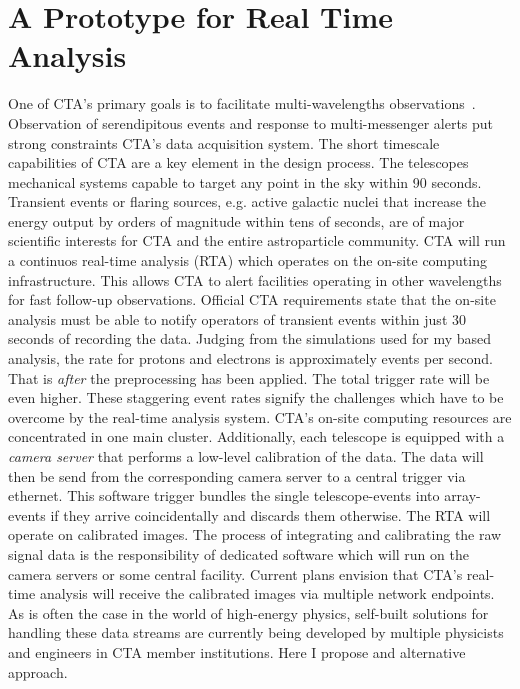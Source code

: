 \chapter{A Prototype for  Real Time Analysis}
\label{ch:rta}
One of CTA's primary goals is to facilitate multi-wavelengths observations~\cite[Chapter~9]{cta:science}. 
Observation of serendipitous events and response to multi-messenger alerts put strong constraints CTA's data acquisition system.
The short timescale capabilities of CTA are a key element in the design process.
The telescopes mechanical systems capable to target any point in the sky within 90 seconds. 
Transient events or flaring sources, e.g. active galactic nuclei that increase the energy output by orders of magnitude within tens of seconds, 
are of major scientific interests for CTA and the entire astroparticle community.
CTA will run a continuos real-time analysis (RTA) which operates on the on-site computing infrastructure.
This allows CTA to alert facilities operating in other wavelengths for fast follow-up observations. 
Official CTA requirements state that the on-site analysis must be able to notify operators 
of transient events within just 30 seconds of recording the data.
Judging from the simulations used for my \ctapipe based analysis,
the rate for protons and electrons is approximately  events per second. That is \emph{after} the preprocessing has been applied.
The total trigger rate will be even higher.
These staggering event rates  signify the challenges which have to be overcome by the real-time analysis system.
CTA's on-site computing resources are concentrated in one main cluster. Additionally, each telescope is equipped with a \emph{camera server} that performs a low-level 
calibration of the data.
The data will then be send from the corresponding camera server to a central trigger via ethernet.
This software trigger bundles the single telescope-events into array-events if they arrive coincidentally and discards them otherwise. 
The RTA will operate on calibrated images. The process of integrating and calibrating the 
raw signal data is the responsibility of dedicated software which will run on the camera servers or some central facility.
Current plans envision that CTA's real-time analysis will receive the calibrated images via multiple network endpoints.
As is often the case in the world of high-energy physics, self-built solutions for handling these data streams are currently being developed 
by multiple physicists and engineers in CTA member institutions.
Here I propose and alternative approach. 

